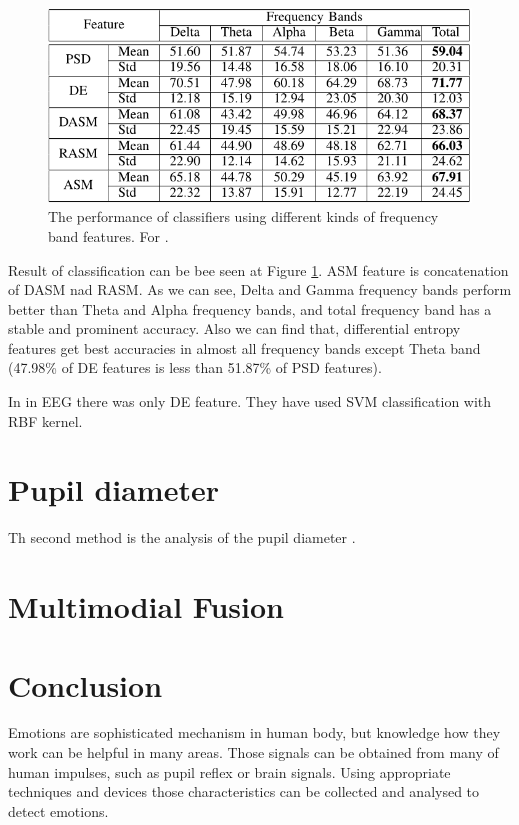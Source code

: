 \documentclass[10pt,journal,compsoc,twoside]{IEEEtran}
\newcommand{\Ref}[2]{#2 \ref{#1}}
\begin{document}
\begin{figure}[ht]
	\centering
	\includegraphics[width=1.0\linewidth]{performanceOfClassifier1}
	\caption{The performance of classifiers using different kinds of frequency band features. For \cite{WeiLongBoNanBaoLiang2014}.}
	\label{fig:performanceofclassifier1}
\end{figure}
Result of classification can be bee seen at \Ref{fig:performanceofclassifier1}{Figure}. ASM feature is concatenation of DASM nad RASM. As we can see, Delta and Gamma frequency bands perform better than Theta and Alpha frequency bands, and total frequency band has a stable and  prominent  accuracy.  Also  we  can  find  that,  differential entropy features get best accuracies in almost all frequency  bands  except  Theta  band  (47.98\%  of  DE  features is  less  than  51.87\%  of  PSD  features).
\newline
\par In \cite{SoleymaniPanticPun2002} in EEG there was only DE feature. They have used SVM classification with RBF kernel.

\section{Pupil diameter}
Th second method is the analysis of the pupil diameter \cite{ZhaiBarreto}. 


\section{Multimodial Fusion}
\section{Conclusion}

Emotions are sophisticated mechanism in human body, but knowledge how they work can be helpful in many areas. Those signals can be obtained from many of human impulses, such as pupil reflex or brain signals. Using appropriate techniques and devices those characteristics can be collected and analysed to detect emotions.
	
\end{document}
